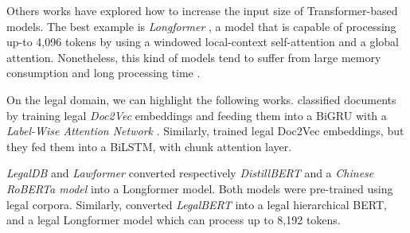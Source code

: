 \documentclass[11pt]{article}
\begin{document}

    Others works have explored how to increase the input size of Transformer-based models. The best example is \textit{Longformer} \cite{beltagy_longformer_2020}, a model that is capable of processing up-to 4,096 tokens by using a windowed local-context self-attention and a global attention. Nonetheless, this kind of models tend to suffer from large memory consumption and long processing time \cite{park_efficient_2022}.

    On the legal domain, we can highlight the following works. \citet{chalkidis_large-scale_2019} classified documents by training legal \textit{Doc2Vec} embeddings \cite{pmlr-v32-le14} and feeding them into a BiGRU with a \textit{Label-Wise Attention Network} \cite{mullenbach-etal-2018-explainable}. Similarly, \citet{wan_long-length_2019} trained legal Doc2Vec embeddings, but they fed them into a BiLSTM, with chunk attention layer.
    

    \textit{LegalDB} \cite{bambroo_legaldb_2021} and \textit{Lawformer} \cite{xiao_lawformer_2021} converted respectively \textit{DistillBERT} \cite{sanh2020distilbertdistilledversionbert} and a \textit{Chinese RoBERTa model} \cite{9599397} into a Longformer model. Both models were pre-trained using legal corpora. Similarly,  \citet{mamakas_processing_2022} converted \textit{LegalBERT} \cite{chalkidis_legal-bert_2020} into a legal hierarchical BERT, and a legal Longformer model which can process up to 8,192 tokens.
    
    
\end{document}
